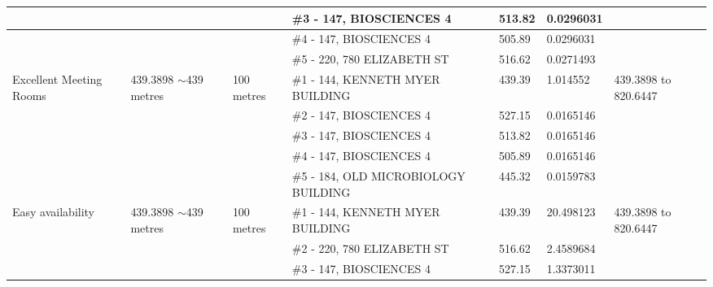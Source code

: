 \begin{table}[H]
{\begin{tabular}{|l|l|l|l|l|l|l|}
                        &                           &                          & \#3 - 147, BIOSCIENCES 4                                & 513.82        & 0.0296031       &                           \\ \hline
                        &                           &                          & \#4 - 147, BIOSCIENCES 4                                & 505.89        & 0.0296031       &                           \\ \hline
                        &                           &                          & \#5 - 220, 780 ELIZABETH ST                             & 516.62        & 0.0271493       &                           \\ \hline
Excellent Meeting Rooms & 439.3898 $\sim$439 metres & 100 metres               & \#1 - 144, KENNETH MYER BUILDING                        & 439.39        & 1.014552        & 439.3898 to 820.6447      \\ \hline
                        &                           &                          & \#2 - 147, BIOSCIENCES 4                                & 527.15        & 0.0165146       &                           \\ \hline
                        &                           &                          & \#3 - 147, BIOSCIENCES 4                                & 513.82        & 0.0165146       &                           \\ \hline
                        &                           &                          & \#4 - 147, BIOSCIENCES 4                                & 505.89        & 0.0165146       &                           \\ \hline
                        &                           &                          & \#5 - 184, OLD MICROBIOLOGY BUILDING                    & 445.32        & 0.0159783       &                           \\ \hline
Easy availability       & 439.3898 $\sim$439 metres & 100 metres               & \#1 - 144, KENNETH MYER BUILDING                        & 439.39        & 20.498123       & 439.3898 to 820.6447      \\ \hline
                        &                           &                          & \#2 - 220, 780 ELIZABETH ST                             & 516.62        & 2.4589684       &                           \\ \hline
                        &                           &                          & \#3 - 147, BIOSCIENCES 4                                & 527.15        & 1.3373011       &                           \\ \hline

\end{tabular}}
\end{table}
